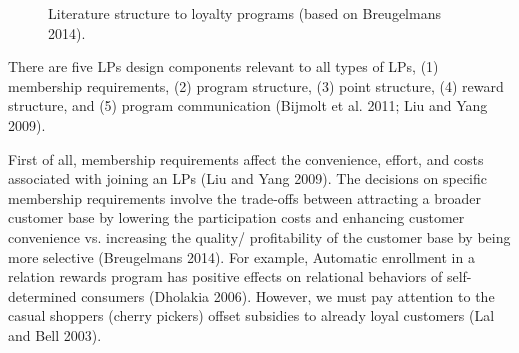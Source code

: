 \documentclass[12pt]{article}
\begin{document}
\begin{spacing}{1.5}
\begin{figure}[h]
\caption{Literature structure to loyalty programs (based on Breugelmans 2014).}
\label{fig:6forces}
\end{figure}

There are five LPs design components relevant to all types of LPs, (1) membership requirements, (2) program structure, (3) point structure, (4) reward structure, and (5) program communication (Bijmolt et al. 2011; Liu and Yang 2009)\cite{bijmolt2011loyalty}\cite{liu2009competing}.

First of all, membership requirements affect the convenience, effort, and costs associated with joining an LPs (Liu and Yang 2009)\cite{liu2009competing}. The decisions on specific membership requirements involve the trade-offs between attracting a broader customer base by lowering the participation costs and enhancing customer convenience vs. increasing the quality/ profitability of the customer base by being more selective (Breugelmans 2014)\cite{breugelmans2015advancing}. For example, Automatic enrollment in a relation rewards program has positive effects on relational behaviors of self-determined consumers (Dholakia 2006)\cite{dholakia2006customer}. However, we must pay attention to the casual shoppers (cherry pickers) offset subsidies to already loyal customers (Lal and Bell 2003)\cite{lal2003impact}. 


\end{spacing}
\end{document}
